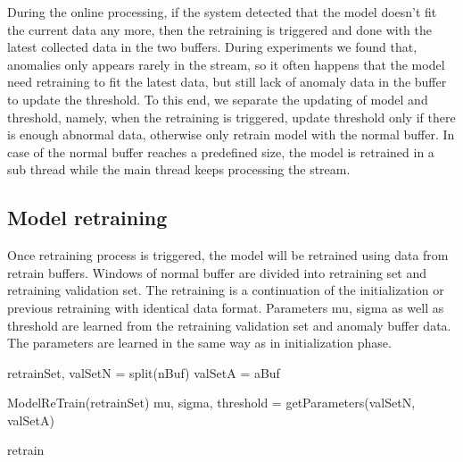 During the online processing, if the system detected that the model doesn’t fit the current data any more, then the retraining is triggered and done with the latest collected data in the two buffers. During experiments we found that, anomalies only appears rarely in the stream, so it often happens that the model need retraining to fit the latest data, but still lack of anomaly data in the buffer to update the threshold. To this end, we separate the updating of model and threshold, namely, when the retraining is triggered, update threshold only if there is enough abnormal data, otherwise only retrain model with the normal buffer. In case of the normal buffer reaches a predefined size, the model is retrained in a sub thread while the main thread keeps processing the stream. 

\subsection{Model retraining}
\label{retraining}

Once retraining process is triggered, the model will be retrained using data from retrain buffers. Windows of normal buffer are divided into retraining set and retraining validation set. The retraining is a continuation of the initialization or previous retraining with identical data format. Parameters mu, sigma as well as threshold are learned from the retraining validation set and anomaly buffer data. The parameters are learned in the same way as in initialization phase.

\begin{algorithm}[h]

\BlankLine 
retrainSet, valSetN = split(nBuf)\;
valSetA = aBuf\;

ModelReTrain(retrainSet)\;
mu, sigma, threshold = getParameters(valSetN, valSetA)

\caption{retrain}
\label{alg:retrain}
\end{algorithm}




